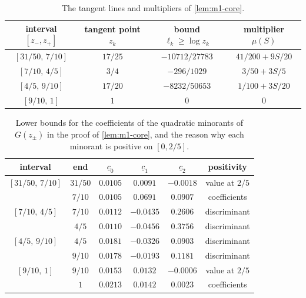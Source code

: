 \begin{table}[htbp]
  \centering
  \caption{The tangent lines and multipliers of \cref{lem:m1-core}.}\label{tab:m1-core}
  \begin{tabular}{@{}cccc@{}}
    \toprule
    interval $[z_-,z_+]$ & tangent point $z_k$ & bound $\ell_k\ge\log z_k$ & multiplier $\mu(S)$\\
    \midrule
    $[31/50,\,7/10]$ & $17/25$ & $-10712/27783$ & $41/200+9S/20$\\
    $[7/10,\,4/5]$ & $3/4$ & $-296/1029$ & $3/50+3S/5$\\
    $[4/5,\,9/10]$ & $17/20$ & $-8232/50653$ & $1/100+3S/20$\\
    $[9/10,\,1]$ & $1$ & $0$ & $0$\\
    \bottomrule
  \end{tabular}
\end{table}

\begin{table}[htbp]
  \centering
  \caption{Lower bounds for the coefficients of the quadratic minorants of $G(z_\pm)$ in the
  proof of \cref{lem:m1-core}, and the reason why each minorant is positive on
  $[0,2/5]$.}\label{tab:m1-core-ends}
  \begin{tabular}{@{}cccccc@{}}
    \toprule
    interval & end & $\underline c_0$ & $\underline c_1$ & $\underline c_2$ & positivity\\
    \midrule
    $[31/50,\,7/10]$ & $31/50$ & $0.0105$ & $0.0091$ & $-0.0018$ & value at $2/5$\\
                     & $7/10$  & $0.0105$ & $0.0691$ & $0.0907$ & coefficients\\
    $[7/10,\,4/5]$   & $7/10$  & $0.0112$ & $-0.0435$ & $0.2606$ & discriminant\\
                     & $4/5$   & $0.0110$ & $-0.0456$ & $0.3756$ & discriminant\\
    $[4/5,\,9/10]$   & $4/5$   & $0.0181$ & $-0.0326$ & $0.0903$ & discriminant\\
                     & $9/10$  & $0.0178$ & $-0.0193$ & $0.1181$ & discriminant\\
    $[9/10,\,1]$     & $9/10$  & $0.0153$ & $0.0132$ & $-0.0006$ & value at $2/5$\\
                     & $1$     & $0.0213$ & $0.0142$ & $0.0023$ & coefficients\\
    \bottomrule
  \end{tabular}
\end{table}

